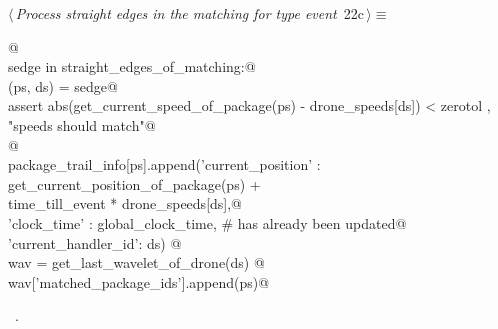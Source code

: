 \documentclass[10pt, english, oneside]{report}
\begin{document}
\begin{flushleft} \small
\begin{minipage}{\linewidth}\label{scrap26}\raggedright\small
{} $\langle\,${\itshape Process straight edges in the matching for type  event}\nobreak\ {\footnotesize {22c}}$\,\rangle\equiv$
\vspace{-1ex}
\begin{list}{}{} \item
\mbox{}\verb@   @\\
\mbox{}\verb@for sedge in straight_edges_of_matching:@\\
\mbox{}\verb@      (ps, ds) = sedge@\\
\mbox{}\verb@      assert abs(get_current_speed_of_package(ps) - drone_speeds[ds]) < zerotol , "speeds should match"@\\
\mbox{}\verb@      @\\
\mbox{}\verb@      package_trail_info[ps].append({'current_position'  : get_current_position_of_package(ps) +\@\\
\mbox{}\verb@                                                            time_till_event * drone_speeds[ds],@\\
\mbox{}\verb@                                     'clock_time'        : global_clock_time, # has already been updated@\\
\mbox{}\verb@                                     'current_handler_id': ds}) @\\
\mbox{}\verb@      wav = get_last_wavelet_of_drone(ds)     @\\
\mbox{}\verb@      wav['matched_package_ids'].append(ps)@\\
\mbox{}\verb@@{\NWsep}
\end{list}
\vspace{-1.5ex}
\footnotesize
\begin{list}{}{\setlength{\itemsep}{-\parsep}\setlength{\itemindent}{-\leftmargin}}
\item \NWtxtMacroRefIn\ .

\item{}
\end{list}
\end{minipage}\vspace{4ex}
\end{flushleft}
\end{document}
